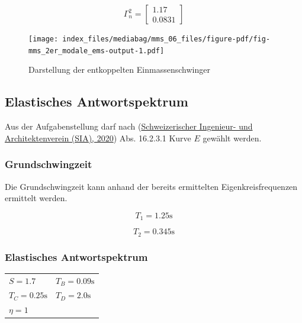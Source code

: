 \documentclass[
  letterpaper,
  DIV=11]{scrreprt}
\begin{document}
\begin{equation}\Gamma^{2}_{n} = \left[\begin{matrix}1.17\\0.0831\end{matrix}\right]\end{equation}

\begin{figure}[H]

{\centering \texttt{[image: index\_files/mediabag/mms\_06\_files/figure-pdf/fig-mms\_2er\_modale\_ems-output-1.pdf]}

}

\caption{\label{fig-mms_2er_modale_ems}Darstellung der entkoppelten
Einmassenschwinger}

\end{figure}

\hypertarget{elastisches-antwortspektrum-4}{%
\subsection{Elastisches
Antwortspektrum}\label{elastisches-antwortspektrum-4}}

Aus der Aufgabenstellung darf nach
(\protect\hyperlink{ref-SIA261_2020}{Schweizerischer Ingenieur- und
Architektenverein (SIA), 2020}) Abs. 16.2.3.1 Kurve \(E\) gewählt
werden.

\hypertarget{grundschwingzeit-2}{%
\subsubsection{Grundschwingzeit}\label{grundschwingzeit-2}}

Die Grundschwingzeit kann anhand der bereits ermittelten
Eigenkreisfrequenzen ermittelt werden.

\begin{equation}T_{1} = 1.25 \text{s}\end{equation}

\begin{equation}T_{2} = 0.345 \text{s}\end{equation}

\hypertarget{elastisches-antwortspektrum-5}{%
\subsubsection{Elastisches
Antwortspektrum}\label{elastisches-antwortspektrum-5}}

\begin{longtable}[]{@{}
  >{\raggedright\arraybackslash}p{}
  >{\raggedright\arraybackslash}p{}@{}}
\toprule\noalign{}
\endhead
\bottomrule\noalign{}
\endlastfoot
\(S = 1.7\) & \(T_{B} = 0.09 \text{s}\) \\
\(T_{C} = 0.25 \text{s}\) & \(T_{D} = 2.0 \text{s}\) \\
\(\eta = 1\) & \\
\end{longtable}
\end{document}
